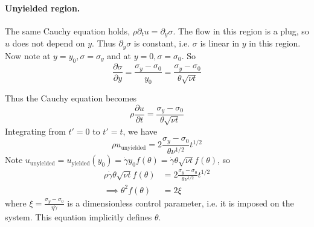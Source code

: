 \documentclass{jknotes}
\newcommand{\srate}{\dot{\gamma}}
\begin{document}
\paragraph{Unyielded region.} The same Cauchy equation holds, $\rho \partial_t
u = \partial_y \sigma$. The flow in this region is a plug, so $u$ does not
depend on $y$. Thus $\partial_y \sigma$ is constant, i.e. $\sigma$ is linear
in $y$ in this region. Now note at $y=y_0, \sigma=\sigma_y$ and at $y=0,
\sigma=\sigma_0$. So
\begin{equation}
	\frac{\partial \sigma}{\partial y} = \frac{\sigma_y - \sigma_0}{y_0} =
		\frac{\sigma_y - \sigma_0}{\theta \sqrt{\nu t}}
\end{equation}

Thus the Cauchy equation becomes
\begin{equation}
	\rho \frac{\partial u}{\partial t} = \frac{\sigma_y - \sigma_0}{\theta
	\sqrt{\nu t}}
\end{equation}
Integrating from $t' = 0$ to $t' = t$, we have
\begin{equation}
	\rho u_{\text{unyielded}} = 2 \frac{\sigma_y - \sigma_0}{\theta \nu^{1/2}}
	t^{1/2}
\end{equation}
Note $u_{\text{unyielded}} = u_{\text{yielded}}(y_0) = \srate y_0 f(\theta) =
\srate \theta \sqrt{\nu t} f(\theta)$, so
\begin{align}
	\rho \srate \theta \sqrt{\nu t} f(\theta) &= 2 \frac{\sigma_y -
	\sigma_0}{\theta \nu^{1/2}}t^{1/2}\\
	\implies \theta^2 f(\theta) &= 2 \xi
\end{align}
where $\xi = \frac{\sigma_y - \sigma_0}{\eta \srate}$ is a dimensionless
control parameter, i.e. it is imposed on the system. This equation implicitly
defines $\theta$.
\end{document}
